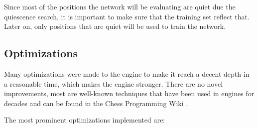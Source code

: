 Since most of the positions the network will be evaluating are quiet due the quiescence search, it is important to make sure that the training set reflect that. Later on, only positions that are quiet will be used to train the network.

\subsection{Optimizations}

Many optimizations were made to the engine to make it reach a decent depth in a reasonable time, which makes the engine stronger. There are no novel improvements, most are well-known techniques that have been used in engines for decades and can be found in the Chess Programming Wiki \cite{cpw}.

The most prominent optimizations implemented are:

